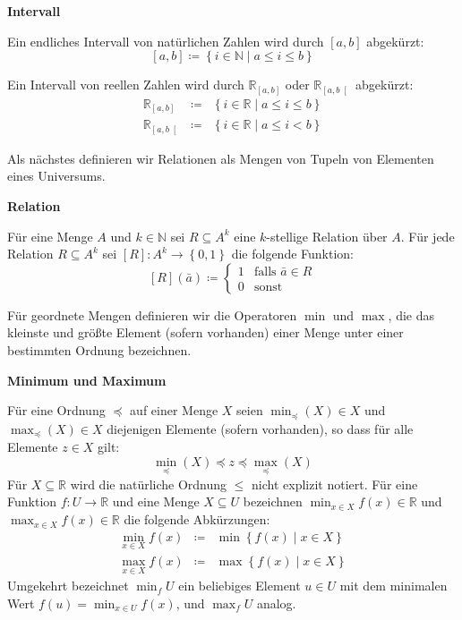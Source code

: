 \begin{defn}
\textbf{Intervall}

Ein endliches Intervall von natürlichen Zahlen wird durch $\left[a,b\right]$
abgekürzt:
\[
\left[a,b\right]\coloneqq\left\{ i\in\mathbb{N}\mid a\leqslant i\leqslant b\right\} 
\]

Ein Intervall von reellen Zahlen wird durch $\mathbb{R}_{\left[a,b\right]}$
oder $\mathbb{R}_{\left[a,b\right[}$ abgekürzt: 
\begin{eqnarray*}
\mathbb{R}_{\left[a,b\right]} & \coloneqq & \left\{ i\in\mathbb{R}\mid a\leqslant i\leqslant b\right\} \\
\mathbb{R}_{\left[a,b\right[} & \coloneqq & \left\{ i\in\mathbb{R}\mid a\leqslant i<b\right\} 
\end{eqnarray*}
\end{defn}
Als nächstes definieren wir Relationen als Mengen von Tupeln von Elementen
eines Universums. 
\begin{defn}
\textbf{\label{def:relation}Relation}

Für eine Menge $A$ und $k\in\mathbb{N}$ sei $R\subseteq A^{k}$
eine $k$-stellige Relation über $A$. Für jede Relation $R\subseteq A^{k}$
sei $\left[R\right]:A^{k}\rightarrow\left\{ 0,1\right\} $ die folgende
Funktion: 
\[
\left[R\right]\left(\bar{a}\right)\coloneqq\begin{cases}
1 & \mathrm{falls}\,\,\bar{a}\in R\\
0 & \mathrm{sonst}
\end{cases}
\]
\end{defn}
Für geordnete Mengen definieren wir die Operatoren $\min$ und $\max$,
die das kleinste und größte Element (sofern vorhanden) einer Menge
unter einer bestimmten Ordnung bezeichnen.
\begin{defn}
\textbf{Minimum und Maximum}

Für eine Ordnung $\preceq$ auf einer Menge $X$ seien $\min_{\preceq}\left(X\right)\in X$
und $\max_{\preceq}\left(X\right)\in X$ diejenigen Elemente (sofern
vorhanden), so dass für alle Elemente $z\in X$ gilt:
\[
\min_{\preceq}\left(X\right)\preceq z\preceq\max_{\preceq}\left(X\right)
\]
Für $X\subseteq\mathbb{R}$ wird die natürliche Ordnung $\leqslant$
nicht explizit notiert. Für eine Funktion $f:U\rightarrow\mathbb{R}$
und eine Menge $X\subseteq U$ bezeichnen $\min_{x\in X}f\left(x\right)\in\mathbb{R}$
und $\max_{x\in X}f\left(x\right)\in\mathbb{R}$ die folgende Abkürzungen:
\begin{eqnarray*}
\min_{x\in X}f\left(x\right) & \coloneqq & \min\left\{ f\left(x\right)\mid x\in X\right\} \\
\max_{x\in X}f\left(x\right) & \coloneqq & \max\left\{ f\left(x\right)\mid x\in X\right\} 
\end{eqnarray*}
Umgekehrt bezeichnet $\min_{f}U$ ein beliebiges Element $u\in U$
mit dem minimalen Wert $f\left(u\right)=\min_{x\in U}f\left(x\right)$,
und $\max_{f}U$ analog.
\end{defn}
